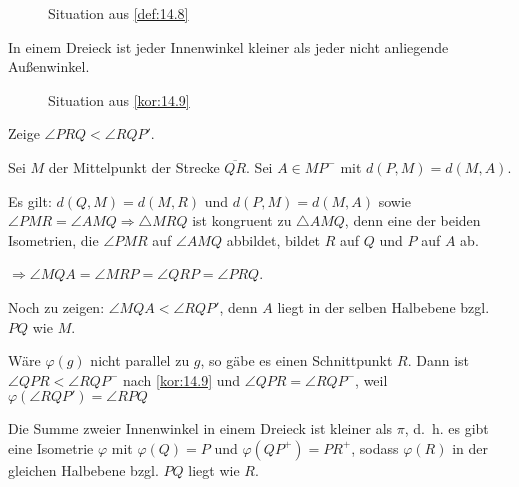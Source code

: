 \begin{figure}[ht]
    \centering
    \label{fig:def.14.8.0}
    \caption{Situation aus \cref{def:14.8}}
\end{figure}

\begin{korollar}\label{kor:14.9}%
    In einem Dreieck ist jeder Innenwinkel kleiner als jeder nicht 
    anliegende Außenwinkel.
\end{korollar}

\begin{figure}[htp]
    \centering
    
    \caption{Situation aus \cref{kor:14.9}}
    \label{fig:bem.14.9}
\end{figure}

\begin{beweis}
    Zeige $\angle PRQ < \angle RQP'$.

    Sei $M$ der Mittelpunkt der Strecke $\overline{QR}$. Sei
    $A \in MP^-$ mit $d(P,M) = d(M,A)$.

    Es gilt: $d(Q,M) = d(M,R)$ und $d(P,M) = d(M,A)$ sowie 
    $\angle PMR = \angle AMQ \Rightarrow \triangle MRQ$ ist
    kongruent zu $\triangle AMQ$, denn eine der beiden Isometrien, die
    $\angle PMR$ auf $\angle AMQ$ abbildet, bildet $R$ auf $Q$ und
    $P$ auf $A$ ab.

    $\Rightarrow \angle MQA = \angle MRP = \angle QRP = \angle PRQ$.

    Noch zu zeigen: $\angle MQA < \angle RQP'$, denn $A$ liegt in der
    selben Halbebene bzgl. $PQ$ wie $M$.
\end{beweis}

\begin{beweis}
    Wäre $\varphi(g)$ nicht parallel zu $g$, so gäbe es einen 
    Schnittpunkt $R$. Dann ist $\angle QPR < \angle RQP^-$ nach
    \cref{kor:14.9} und $\angle QPR = \angle RQP^-$, weil
    $\varphi(\angle RQP') = \angle RPQ$
\end{beweis}

\begin{folgerung}\label{folgerung:14.10}%
    Die Summe zweier Innenwinkel in einem Dreieck ist kleiner als
    $\pi$, d.~h. es gibt eine Isometrie $\varphi$ mit $\varphi(Q) = P$
    und $\varphi(QP^+) = PR^+$, sodass $\varphi(R)$ in der gleichen
    Halbebene bzgl. $PQ$ liegt wie $R$.
\end{folgerung}

